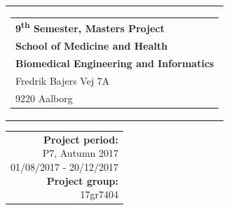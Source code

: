 % 
\thispagestyle{empty}
\begin{titlepage}
{\samepage 

\begin{tabular}{r}
\parbox{\textwidth}{  
\hfill \hspace{2cm} \parbox{8cm}{\begin{tabular}{l} %
{\small \textbf{\textcolor{aaublue}{{9\textsuperscript{th} Semester, Masters Project}}}}\\
{\small \textbf{\textcolor{aaublue}{School of Medicine and Health}}}\\
{\small \textbf{\textcolor{aaublue}{Biomedical Engineering and Informatics}}}\\
{\small \textcolor{aaublue}{Fredrik Bajers Vej 7A}} \\
{\small \textcolor{aaublue}{9220 Aalborg}} \\
\end{tabular}}}
\end{tabular}}

\begin{tabular}{r}




\parbox{5cm}{


\textbf{Project period:}\\
P7, Autumn 2017\\
01/08/2017 - 20/12/2017\\
   
\textbf{Project group:}\\
17gr7404\\ %
  
}
\end{tabular}
\end{titlepage}
